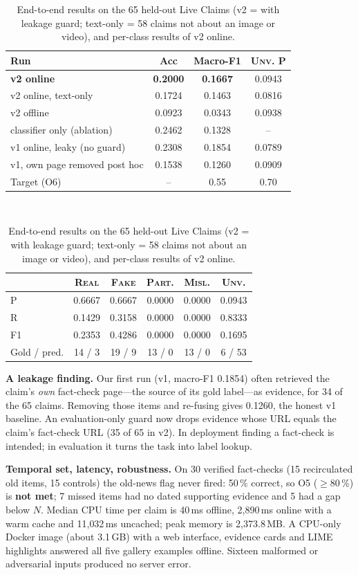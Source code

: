 \documentclass[conference]{IEEEtran}
\newcommand{\cls}[1]{\textsc{#1}}          %
\begin{document}
\begin{table}[t]
\caption{End-to-end results on the 65 held-out Live Claims (v2 = with leakage guard; text-only = 58 claims not about an image or video), and per-class results of v2 online.}
\label{tab:e2e}
\centering\footnotesize
\setlength{\tabcolsep}{3pt}
\begin{tabular}{@{}l c c c@{}}
\toprule
Run & Acc & Macro-F1 & \cls{Unv.} P \\
\midrule
\textbf{v2 online} & \textbf{0.2000} & \textbf{0.1667} & 0.0943 \\
v2 online, text-only & 0.1724 & 0.1463 & 0.0816 \\
v2 offline & 0.0923 & 0.0343 & 0.0938 \\
classifier only (ablation) & 0.2462 & 0.1328 & -- \\
v1 online, leaky (no guard) & 0.2308 & 0.1854 & 0.0789 \\
v1, own page removed post hoc & 0.1538 & 0.1260 & 0.0909 \\
Target (O6) & -- & 0.55 & 0.70 \\
\bottomrule
\end{tabular}\\[4pt]
\begin{tabular}{@{}l c c c c c@{}}
\toprule
 & \cls{Real} & \cls{Fake} & \cls{Part.} & \cls{Misl.} & \cls{Unv.} \\
\midrule
P  & 0.6667 & 0.6667 & 0.0000 & 0.0000 & 0.0943 \\
R  & 0.1429 & 0.3158 & 0.0000 & 0.0000 & 0.8333 \\
F1 & 0.2353 & 0.4286 & 0.0000 & 0.0000 & 0.1695 \\
Gold / pred. & 14 / 3 & 19 / 9 & 13 / 0 & 13 / 0 & 6 / 53 \\
\bottomrule
\end{tabular}
\end{table}

\textbf{A leakage finding.} Our first run (v1, macro-F1 0.1854) often retrieved the claim's \emph{own} fact-check page---the source of its gold label---as evidence, for 34 of the 65 claims. Removing those items and re-fusing gives 0.1260, the honest v1 baseline. An evaluation-only guard now drops evidence whose URL equals the claim's fact-check URL (35 of 65 in v2). In deployment finding a fact-check is intended; in evaluation it turns the task into label lookup.

\textbf{Temporal set, latency, robustness.} On 30 verified fact-checks (15 recirculated old items, 15 controls) the old-news flag never fired: 50\,\% correct, so O5 ($\geq 80$\,\%) is \textbf{not met}; 7 missed items had no dated supporting evidence and 5 had a gap below $N$. Median CPU time per claim is 40\,ms offline, 2{,}890\,ms online with a warm cache and 11{,}032\,ms uncached; peak memory is 2{,}373.8\,MB. A CPU-only Docker image (about 3.1\,GB) with a web interface, evidence cards and LIME highlights answered all five gallery examples offline. Sixteen malformed or adversarial inputs produced no server error.
\end{document}
